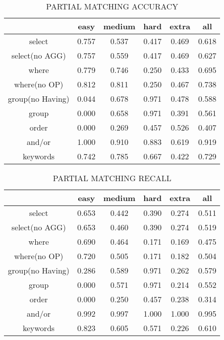 \begin{table}[h!]
    \centering
    \begin{tabular}{|c|c|c|c|c|c|}
        \hline
                         & easy  & medium & hard  & extra & all   \\ \hline
        select           & 0.757 & 0.537  & 0.417 & 0.469 & 0.618 \\ \hline
        select(no AGG)   & 0.757 & 0.559  & 0.417 & 0.469 & 0.627 \\ \hline
        where            & 0.779 & 0.746  & 0.250 & 0.433 & 0.695 \\ \hline
        where(no OP)     & 0.812 & 0.811  & 0.250 & 0.467 & 0.738 \\ \hline
        group(no Having) & 0.044 & 0.678  & 0.971 & 0.478 & 0.588 \\ \hline
        group            & 0.000 & 0.658  & 0.971 & 0.391 & 0.561 \\ \hline
        order            & 0.000 & 0.269  & 0.457 & 0.526 & 0.407 \\ \hline
        and/or           & 1.000 & 0.910  & 0.883 & 0.619 & 0.919 \\ \hline

        keywords         & 0.742 & 0.785  & 0.667 & 0.422 & 0.729 \\ \hline
    \end{tabular}
    \caption{PARTIAL MATCHING ACCURACY}

\end{table}
\begin{table}[h!]
    \centering
    \begin{tabular}{|c|c|c|c|c|c|}
        \hline
                         & easy  & medium & hard  & extra & all   \\ \hline
        select           & 0.653 & 0.442  & 0.390 & 0.274 & 0.511 \\ \hline
        select(no AGG)   & 0.653 & 0.460  & 0.390 & 0.274 & 0.519 \\ \hline
        where            & 0.690 & 0.464  & 0.171 & 0.169 & 0.475 \\ \hline
        where(no OP)     & 0.720 & 0.505  & 0.171 & 0.182 & 0.504 \\ \hline
        group(no Having) & 0.286 & 0.589  & 0.971 & 0.262 & 0.579 \\ \hline
        group            & 0.000 & 0.571  & 0.971 & 0.214 & 0.552 \\ \hline
        order            & 0.000 & 0.250  & 0.457 & 0.238 & 0.314 \\ \hline
        and/or           & 0.992 & 0.997  & 1.000 & 1.000 & 0.995 \\ \hline

        keywords         & 0.823 & 0.605  & 0.571 & 0.226 & 0.610 \\ \hline
    \end{tabular}
    \caption{PARTIAL MATCHING RECALL }

\end{table}
